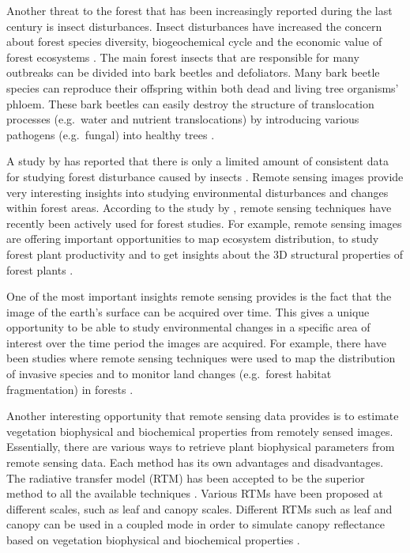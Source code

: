 \documentclass[a4paper, twoside]{templates/ociamthesis}
\begin{document}
Another threat to the forest that has been increasingly reported during the last century is insect disturbances. Insect disturbances have increased the concern about forest species diversity, biogeochemical cycle and the economic value of forest ecosystems \citep{senf2017remote}. The main forest insects that are responsible for many outbreaks can be divided into bark beetles and defoliators. Many bark beetle species can reproduce their offspring within both dead and living tree organisms' phloem. These bark beetles can easily destroy the structure of translocation processes (e.g.~water and nutrient translocations) by introducing various pathogens (e.g.~fungal) into healthy trees \citep{senf2017remote}.

A study by \citet{kautz2017biotic} has reported that there is only a limited amount of consistent data for studying forest disturbance caused by insects \citep{senf2017remote}. Remote sensing images provide very interesting insights into studying environmental disturbances and changes within forest areas. According to the study by \citet{lechner2020applications}, remote sensing techniques have recently been actively used for forest studies. For example, remote sensing images are offering important opportunities to map ecosystem distribution, to study forest plant productivity and to get insights about the 3D structural properties of forest plants \citep{lechner2020applications}.

One of the most important insights remote sensing provides is the fact that the image of the earth's surface can be acquired over time. This gives a unique opportunity to be able to study environmental changes in a specific area of interest over the time period the images are acquired. For example, there have been studies where remote sensing techniques were used to map the distribution of invasive species and to monitor land changes (e.g.~forest habitat fragmentation) in forests \citep{lechner2020applications}.

Another interesting opportunity that remote sensing data provides is to estimate vegetation biophysical and biochemical properties from remotely sensed images. Essentially, there are various ways to retrieve plant biophysical parameters from remote sensing data. Each method has its own advantages and disadvantages. The radiative transfer model (RTM) has been accepted to be the superior method to all the available techniques \citep{darvishzadeh2019analysis, wang2018mapping}. Various RTMs have been proposed at different scales, such as leaf and canopy scales. Different RTMs such as leaf and canopy can be used in a coupled mode in order to simulate canopy reflectance based on vegetation biophysical and biochemical properties \citep{morcillo2019quantifying}.
\end{document}
